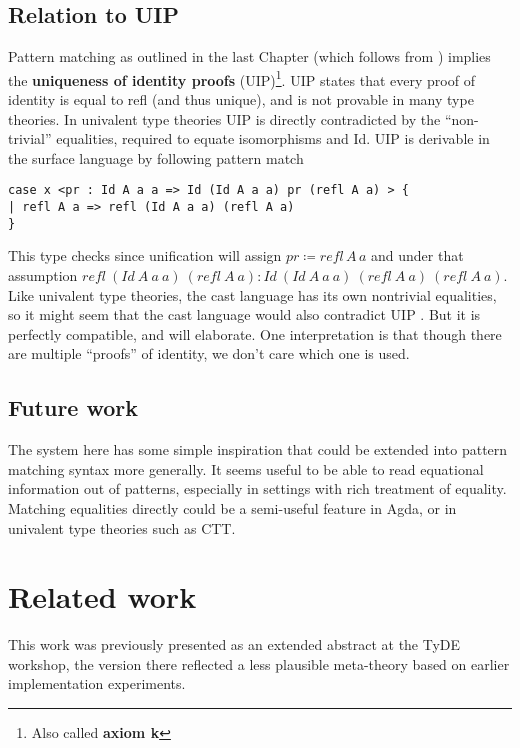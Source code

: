


\subsection{Relation to UIP}

Pattern matching as outlined in the last Chapter (which follows from
\cite{coquand1992pattern}) implies the \textbf{uniqueness of identity
proofs} (UIP)\footnote{Also called \textbf{axiom k}}. UIP states
that every proof of identity is equal to refl (and thus unique), and
is not provable in many type theories. In univalent type theories
UIP is directly contradicted by the ``non-trivial'' equalities,
required to equate isomorphisms and Id. UIP is derivable in the surface
language by following pattern match 

\begin{lstlisting}[basicstyle={\ttfamily\small}]
case x <pr : Id A a a => Id (Id A a a) pr (refl A a) > {
| refl A a => refl (Id A a a) (refl A a)
}
\end{lstlisting}

This type checks since unification will assign $pr\coloneqq refl\,A\,a$
and under that assumption $refl\ (Id\ A\ a\ a)\ (refl\ A\ a):Id\ (Id\ A\ a\ a)\ (refl\ A\ a)\ (refl\ A\ a)$.
Like univalent type theories, the cast language has its own nontrivial
equalities, so it might seem that the cast language would also contradict
UIP . But it is perfectly compatible, and will elaborate. One interpretation
is that though there are multiple ``proofs'' of identity, we don't
care which one is used. 

\subsection{Future work}


The system here has some simple inspiration that could be extended
into pattern matching syntax more generally. It seems useful to be
able to read equational information out of patterns, especially in
settings with rich treatment of equality. Matching equalities directly
could be a semi-useful feature in Agda, or in univalent type theories
such as CTT.

\section{Related work}

This work was previously presented as an extended abstract at the
TyDE workshop, the version there reflected a less
plausible meta-theory based on earlier implementation experiments.

